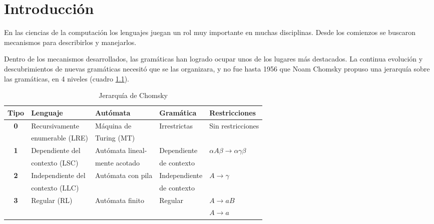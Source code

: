\chapter{Introducci\'on}
\label{chap:intro}

\minitoc

En las ciencias de la computación los lenguajes juegan un rol muy importante en muchas disciplinas. Desde los comienzos se buscaron mecanismos para describirlos y manejarlos.

Dentro de los mecanismos desarrollados, las gramáticas han logrado ocupar unos de los lugares más destacados. La continua evolución y descubrimientos de nuevas gramáticas necesitó que se las organizara, y no fue hasta 1956 que Noam Chomsky propuso una jerarquía sobre las gramáticas, en 4 niveles (cuadro \ref{chomsky}).

\begin{table}[!ht]\centering 
\begin{tabular}{| c | p{3.5cm} | p{3.5cm} | p{2.4cm} | p{2.9cm}|}
\hline

\rowcolor{gris} \textbf{Tipo} & \textbf{Lenguaje} & \textbf{Autómata} & \textbf{Gramática} &  \textbf{Restricciones} \\ \hline

\multirow{2}{*}{\textbf{0}} & Recursivamente   & Máquina de  & \multirow{2}{*}{Irrestrictas} & \multirow{2}{*}{Sin restricciones} \\ 
                            & enumerable (LRE) & Turing (MT) & &  \\ \hline

\multirow{2}{*}{\textbf{1}} & Dependiente del & Autómata lineal- & Dependiente &\multirow{2}{*}{$\alpha A \beta \rightarrow \alpha\gamma\beta$} \\ 
                            & contexto (LSC)  & mente acotado              & de  contexto & \\ \hline

\multirow{2}{*}{\textbf{2}} & Independiente del & \multirow{2}{*}{Autómata con pila} & Independiente & \multirow{2}{*}{$A \rightarrow \gamma$} \\ 
                            & contexto (LLC)    &           & de contexto& \\ \hline

\multirow{2}{*}{\textbf{3}} & \multirow{2}{*}{Regular (RL)} & \multirow{2}{*}{Autómata finito} & \multirow{2}{*}{Regular} &$A \rightarrow aB$ \\ 
                            &              &                 & & $A \rightarrow a$ \\ \hline
\end{tabular}\caption{\label{chomsky} Jerarquía de Chomsky}
\end{table}

